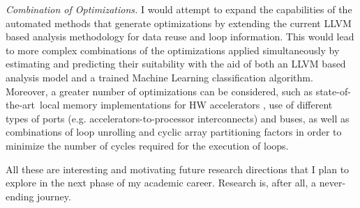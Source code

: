\documentclass[]{usiinfthesis}
\newcommand{\SoTA}{{state-of-the-art}}
\begin{document}
\emph{Combination of Optimizations.}
 I would attempt to expand the capabilities of the automated methods that generate optimizations by extending the current LLVM based 
analysis methodology for data reuse and loop information. This would lead to more complex combinations of the optimizations applied simultaneously by estimating and predicting their suitability with the aid of both an 
LLVM based analysis model and a trained Machine Learning classification algorithm. Moreover, a greater number of 
optimizations can be considered, such as \SoTA\ local memory implementations for HW accelerators \cite{pilato2016system},
use of different types of ports (e.g. accelerators-to-processor interconnects) and buses, as well as combinations of loop unrolling and cyclic array partitioning factors in order to minimize the number of cycles required for the execution of loops.
\par







All these are interesting and motivating future research directions that I plan to explore in the next phase 
of my academic career. Research is, after all, a never-ending journey.




\backmatter


%

%
%


%
%
%
\end{document}
